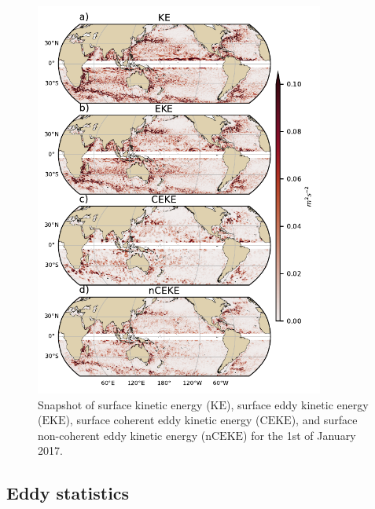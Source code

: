 \documentclass[draft,linenumbers]{agujournal2019}
\newcommand{\KE}{\textrm{KE}}
\newcommand{\EKE}{\textrm{EKE}}
\newcommand{\CEKE}{\textrm{CEKE}}
\newcommand{\nCEKE}{\textrm{nCEKE}}
\begin{document}
	\begin{figure}[t]
	    \centering
	    \includegraphics[width=95mm]{./figures/snapshot_ke_maps_satellite_large.pdf}
	    \caption{Snapshot of surface kinetic energy ($\KE$), surface eddy kinetic energy ($\EKE$), surface coherent eddy kinetic energy ($\CEKE$), and surface non-coherent eddy kinetic energy ($\nCEKE$) for the 1st of January 2017.}
	    \label{fig:eddy_snapshot}
	\end{figure}

	\subsection{Eddy statistics}
\end{document}
